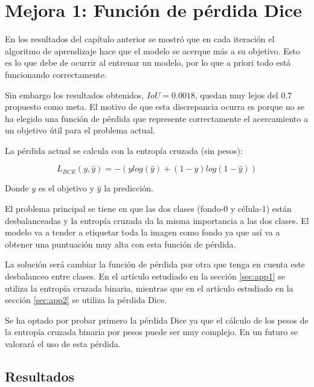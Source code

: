 \chapter{Mejora 1: Función de pérdida Dice}\label{loss_function}

En los resultados del capítulo anterior se mostró que en cada iteración el algoritmo de aprendizaje hace que el modelo se acerque más a su objetivo. Esto es lo que debe de ocurrir al entrenar un modelo, por lo que a priori todo está funcionando correctamente.

Sin embargo los resultados obtenidos, $IoU=0.0018$, quedan muy lejos del $0.7$ propuesto como meta. El motivo de que esta discrepancia ocurra es porque no se ha elegido una función de pérdida que represente correctamente el acercamiento a un objetivo útil para el problema actual.

La pérdida actual se calcula con la entropía cruzada (sin pesos):

\begin{equation}
L_{BCE}(y,\hat{y})=-(y log(\hat{y}) + (1-y)log(1-\hat{y}))
\end{equation}

Donde $y$ es el objetivo y $\hat{y}$ la predicción.

El problema principal se tiene en que las dos clases (fondo-0 y célula-1) están desbalanceadas y la entropía cruzada da la misma importancia a las dos clases. El modelo va a tender a etiquetar toda la imagen como fondo ya que así va a obtener una puntuación muy alta con esta función de pérdida.

La solución será cambiar la función de pérdida por otra que tenga en cuenta este desbalanceo entre clases. En el artículo estudiado en la sección \ref{sec:app1} se utiliza la entropía cruzada binaria, mientras que en el artículo estudiado en la sección \ref{sec:app2} se utiliza la pérdida Dice.

Se ha optado por probar primero la pérdida Dice ya que el cálculo de los pesos de la entropía cruzada binaria por pesos puede ser muy complejo. En un futuro se valorará el uso de esta pérdida.

\section{Resultados}\label{sec:loss_function_resultados}


